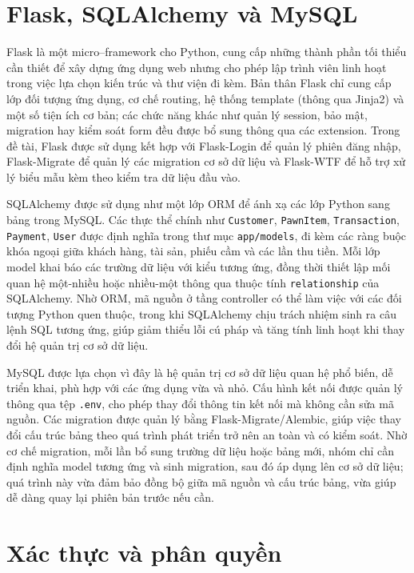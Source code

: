 \documentclass[13pt,a4paper]{extreport}
\begin{document}
\section{Flask, SQLAlchemy và MySQL}

Flask là một micro–framework cho Python, cung cấp những thành phần tối thiểu cần thiết để xây dựng ứng dụng web nhưng cho phép lập trình viên linh hoạt trong việc lựa chọn kiến trúc và thư viện đi kèm. Bản thân Flask chỉ cung cấp lớp đối tượng ứng dụng, cơ chế routing, hệ thống template (thông qua Jinja2) và một số tiện ích cơ bản; các chức năng khác như quản lý session, bảo mật, migration hay kiểm soát form đều được bổ sung thông qua các extension. Trong đề tài, Flask được sử dụng kết hợp với Flask-Login để quản lý phiên đăng nhập, Flask-Migrate để quản lý các migration cơ sở dữ liệu và Flask-WTF để hỗ trợ xử lý biểu mẫu kèm theo kiểm tra dữ liệu đầu vào.

SQLAlchemy được sử dụng như một lớp ORM để ánh xạ các lớp Python sang bảng trong MySQL. Các thực thể chính như \texttt{Customer}, \texttt{PawnItem}, \texttt{Transaction}, \texttt{Payment}, \texttt{User} được định nghĩa trong thư mục \texttt{app/models}, đi kèm các ràng buộc khóa ngoại giữa khách hàng, tài sản, phiếu cầm và các lần thu tiền. Mỗi lớp model khai báo các trường dữ liệu với kiểu tương ứng, đồng thời thiết lập mối quan hệ một-nhiều hoặc nhiều-một thông qua thuộc tính \texttt{relationship} của SQLAlchemy. Nhờ ORM, mã nguồn ở tầng controller có thể làm việc với các đối tượng Python quen thuộc, trong khi SQLAlchemy chịu trách nhiệm sinh ra câu lệnh SQL tương ứng, giúp giảm thiểu lỗi cú pháp và tăng tính linh hoạt khi thay đổi hệ quản trị cơ sở dữ liệu.

MySQL được lựa chọn vì đây là hệ quản trị cơ sở dữ liệu quan hệ phổ biến, dễ triển khai, phù hợp với các ứng dụng vừa và nhỏ. Cấu hình kết nối được quản lý thông qua tệp \texttt{.env}, cho phép thay đổi thông tin kết nối mà không cần sửa mã nguồn. Các migration được quản lý bằng Flask-Migrate/Alembic, giúp việc thay đổi cấu trúc bảng theo quá trình phát triển trở nên an toàn và có kiểm soát. Nhờ cơ chế migration, mỗi lần bổ sung trường dữ liệu hoặc bảng mới, nhóm chỉ cần định nghĩa model tương ứng và sinh migration, sau đó áp dụng lên cơ sở dữ liệu; quá trình này vừa đảm bảo đồng bộ giữa mã nguồn và cấu trúc bảng, vừa giúp dễ dàng quay lại phiên bản trước nếu cần.

\section{Xác thực và phân quyền}
\end{document}
